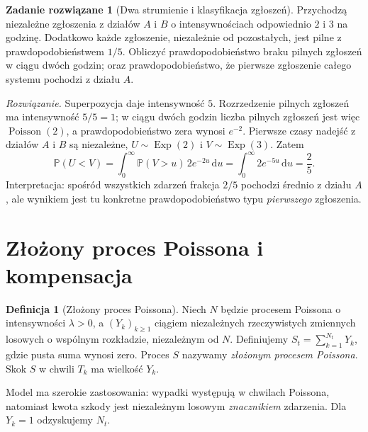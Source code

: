 \documentclass[11pt,a4paper,oneside]{report}
\numberwithin{equation}{chapter}
\theoremstyle{plain}
\theoremstyle{definition}
\newtheorem{definicja}{Definicja}[chapter]
\newtheorem{zadanie}{Zadanie rozwiązane}[chapter]
\theoremstyle{remark}
\newcommand{\Prob}{\mathbb{P}}
\newcommand{\dd}{\mathrm{d}}
\begin{document}
\begin{zadanie}[Dwa strumienie i klasyfikacja zgłoszeń]
Przychodzą niezależne zgłoszenia z działów $A$ i $B$
o intensywnościach odpowiednio $2$ i $3$ na godzinę.
Dodatkowo każde zgłoszenie, niezależnie od pozostałych, jest
pilne z prawdopodobieństwem $1/5$. Obliczyć
prawdopodobieństwo braku pilnych zgłoszeń w ciągu dwóch godzin;
oraz prawdopodobieństwo, że pierwsze zgłoszenie całego systemu
pochodzi z działu $A$.

\emph{Rozwiązanie.} Superpozycja daje intensywność $5$.
Rozrzedzenie pilnych zgłoszeń ma intensywność $5/5=1$;
w ciągu dwóch godzin liczba pilnych zgłoszeń jest więc
$\operatorname{Poisson}(2)$, a prawdopodobieństwo zera wynosi
$e^{-2}$.
Pierwsze czasy nadejść z działów $A$ i $B$ są niezależne,
$U\sim\operatorname{Exp}(2)$ i
$V\sim\operatorname{Exp}(3)$. Zatem
\[
\Prob(U<V)=\int_0^\infty \Prob(V>u)\,2e^{-2u}\,\dd u
=\int_0^\infty 2e^{-5u}\,\dd u=\frac25.
\]
Interpretacja: spośród wszystkich zdarzeń frakcja $2/5$
pochodzi średnio z działu $A$, ale wynikiem jest tu
konkretne prawdopodobieństwo typu \emph{pierwszego} zgłoszenia.
\end{zadanie}

\section{Złożony proces Poissona i kompensacja}
\begin{definicja}[Złożony proces Poissona]
Niech $N$ będzie procesem Poissona o intensywności $\lambda>0$,
a $(Y_k)_{k\ge1}$ ciągiem niezależnych rzeczywistych
zmiennych losowych o wspólnym rozkładzie, niezależnym od $N$.
Definiujemy $S_t=\sum_{k=1}^{N_t}Y_k$,
gdzie pusta suma wynosi zero. Proces $S$ nazywamy
\emph{złożonym procesem Poissona}. Skok $S$ w chwili $T_k$
ma wielkość $Y_k$.
\end{definicja}

Model ma szerokie zastosowania: wypadki występują w chwilach
Poissona, natomiast kwota szkody jest niezależnym losowym
\emph{znacznikiem} zdarzenia. Dla $Y_k=1$ odzyskujemy $N_t$.
\end{document}
